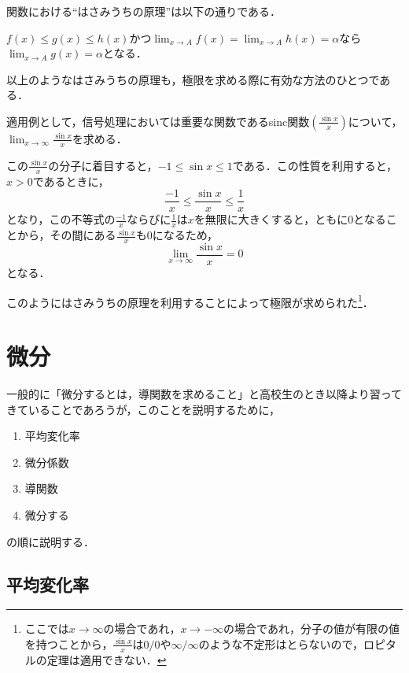 関数における``はさみうちの原理''は以下の通りである．

$f(x) \leq g(x) \leq h(x)$かつ$\displaystyle \lim_{x \rightarrow A}f(x)=\lim_{x \rightarrow A}h(x)=\alpha$なら$\displaystyle \lim_{x \rightarrow A}g(x)=\alpha$となる．

以上のようなはさみうちの原理も，極限を求める際に有効な方法のひとつである．

適用例として，信号処理においては重要な関数であるsinc関数$\displaystyle(\frac{\sin x}{x})$について，$\displaystyle \lim_{x \rightarrow \infty}\frac{\sin x}{x}$を求める．

この$\displaystyle\frac{\sin x}{x}$の分子に着目すると，$\displaystyle -1 \leq \sin x \leq 1$である．この性質を利用すると，$x>0$であるときに，
\begin{equation}
\displaystyle \frac{-1}{x} \leq \frac{\sin x}{x} \leq \frac{1}{x}
\label{eqn:eqn-hasami-uchi}
\end{equation}
となり，この不等式の$\displaystyle \frac{-1}{x}$ならびに$\displaystyle \frac{1}{x}$は$x$を無限に大きくすると，ともに0となることから，その間にある$\displaystyle \frac{\sin x}{x}$も0になるため，
\begin{equation}
\displaystyle \lim_{x \rightarrow \infty}\frac{\sin x}{x}=0
\end{equation}
となる．

このようにはさみうちの原理を利用することによって極限が求められた\footnote{ここでは$x \rightarrow \infty$の場合であれ，$x \rightarrow -\infty$の場合であれ，分子の値が有限の値を持つことから，$\displaystyle\frac{\sin x}{x}$は$0/0$や$\infty / \infty$のような不定形はとらないので，ロピタルの定理は適用できない．}．


\section{微分}

一般的に「微分するとは，導関数を求めること」と高校生のとき以降より習ってきていることであろうが，このことを説明するために，
\begin{enumerate}
\item 平均変化率
\item 微分係数
\item 導関数
\item 微分する
\end{enumerate}
の順に説明する．

\newpage
\subsection{平均変化率}

